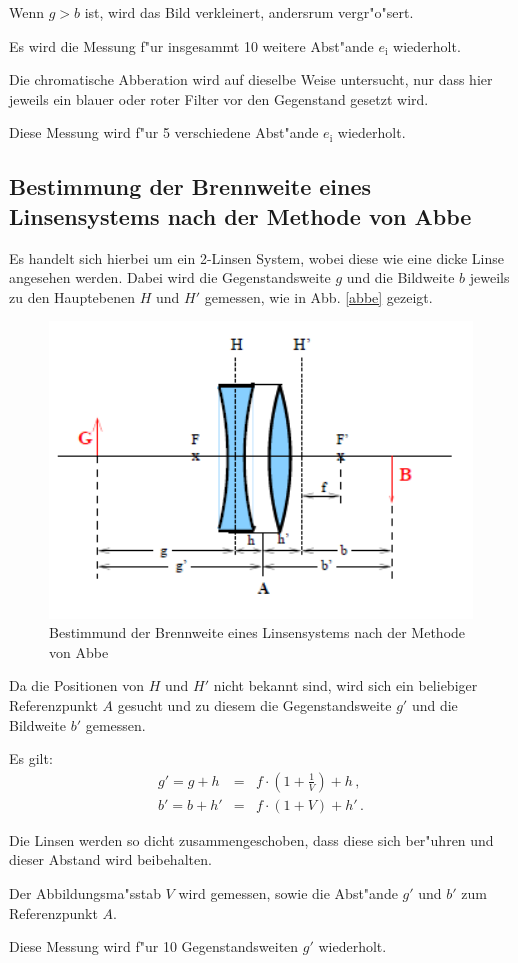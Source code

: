 		Wenn $g > b$ ist, wird das Bild verkleinert, andersrum vergr"o"sert.

		Es wird die Messung f"ur insgesammt 10 weitere Abst"ande $e_\mathrm{i}$ wiederholt.

		Die chromatische Abberation wird auf dieselbe Weise untersucht, nur dass hier jeweils ein blauer oder roter Filter vor den Gegenstand gesetzt wird.

		Diese Messung wird f"ur 5 verschiedene Abst"ande $e_\mathrm{i}$ wiederholt.

	\subsection{Bestimmung der Brennweite eines Linsensystems nach der Methode von Abbe} %
		\label{sub:bestimmung_der_brennweite_eines_linsensystems_nach_der_methode_von_abbe}

		Es handelt sich hierbei um ein 2-Linsen System, wobei diese wie eine dicke Linse angesehen werden.
		Dabei wird die Gegenstandsweite $g$ und die Bildweite $b$ jeweils zu den Hauptebenen $H$ und $H'$ gemessen, wie in Abb. \eqref{abbe} gezeigt.

		\begin{figure}[htbp]
			\centering
			\includegraphics[width = 12cm]{img/abbe.PNG}
			\caption{Bestimmund der Brennweite eines Linsensystems nach der Methode von Abbe}
			\label{abbe}
		\end{figure}

		Da die Positionen von $H$ und $H'$ nicht bekannt sind, wird sich ein beliebiger Referenzpunkt $A$ gesucht und zu diesem die Gegenstandsweite $g'$ und die Bildweite $b'$ gemessen.

		Es gilt:
		\begin{eqnarray}
			g' = g+h &=& f \cdot \left( 1 + \frac{1}{V} \right) + h \, , \label{abbe1}\\
			b' = b+h' &=& f \cdot (1 + V) + h' \, . \label{abbe2}
		\end{eqnarray}

		Die Linsen werden so dicht zusammengeschoben, dass diese sich ber"uhren und dieser Abstand wird beibehalten.

		Der Abbildungsma"sstab $V$ wird gemessen, sowie die Abst"ande $g'$ und $b'$ zum Referenzpunkt $A$.

		Diese Messung wird f"ur 10 Gegenstandsweiten $g'$ wiederholt.